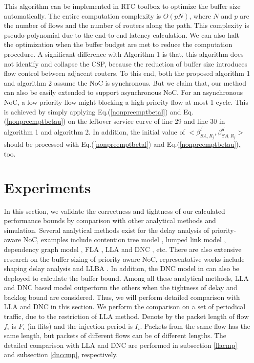 \documentclass[10pt,journal]{IEEEtran}
\begin{document}
This algorithm can be implemented in RTC toolbox \cite{rtc} to optimize the buffer size automatically. The entire computation complexity is $O(pN)$, where $N$ and $p$ are the number of flows and the number of routers along the path. This complexity is pseudo-polynomial due to the end-to-end latency calculation. We can also halt the optimization when the buffer budget are met to reduce the computation procedure. A significant difference with Algorithm 1 is that, this algorithm does not identify and collapse the CSP, because the reduction of buffer size introduces flow control between adjacent routers. To this end, both the proposed algorithm 1 and algorithm 2 assume the NoC is synchronous. But we claim that, our method can also be easily extended to support asynchronous NoC. For an asynchronous NoC, a low-priority flow might blocking a high-priority flow at most 1 cycle. This is achieved by simply applying Eq.(\ref{nonpreemptbetal}) and Eq.(\ref{nonpreemptbetau}) on the leftover service curve of line 29 and line 30 in algorithm 1 and algorithm 2. In addition, the initial value of $<\beta_{SA,R_j}^{l^\prime},\beta_{SA,R_j}^{u^\prime}>$ should be processed with Eq.(\ref{nonpreemptbetal}) and Eq.(\ref{nonpreemptbetau}), too.

\section{Experiments}\label{experiments}
In this section, we validate the correctness and tightness of our calculated performance bounds by comparison with other analytical methods and simulation. Several analytical methods exist for the delay analysis of priority-aware NoC, examples include contention tree model \cite{LuJS05}, lumped link model \cite{707545}, dependency graph model \cite{708526}, FLA \cite{Shi:2008:RCA:1397757.1397996}, LLA \cite{73} and DNC \cite{Qian489900}, etc. There are also extensive research on the buffer sizing of priority-aware NoC, representative works include shaping delay analysis \cite{Manolache:2006:BSO:1131481.1131683} and LLBA \cite{189}. In addition, the DNC model in \cite{Qian489900} can also be deployed to calculate the buffer bound. Among all these analytical methods, LLA and DNC based model outperform the others when the tightness of delay and backlog bound are considered. Thus, we will perform detailed comparison with LLA and DNC in this section. We perform the comparison on a set of periodical traffic, due to the restriction of LLA method. Denote by the packet length of flow $f_i$ is $F_i$ (in flits) and the injection period is $I_i$. Packets from the same flow has the same length, but packets of different flows can be of different lengths. The detailed comparison with LLA and DNC are performed in subsection \ref{llacmp} and subsection \ref{dnccmp}, respectively.
\end{document}
